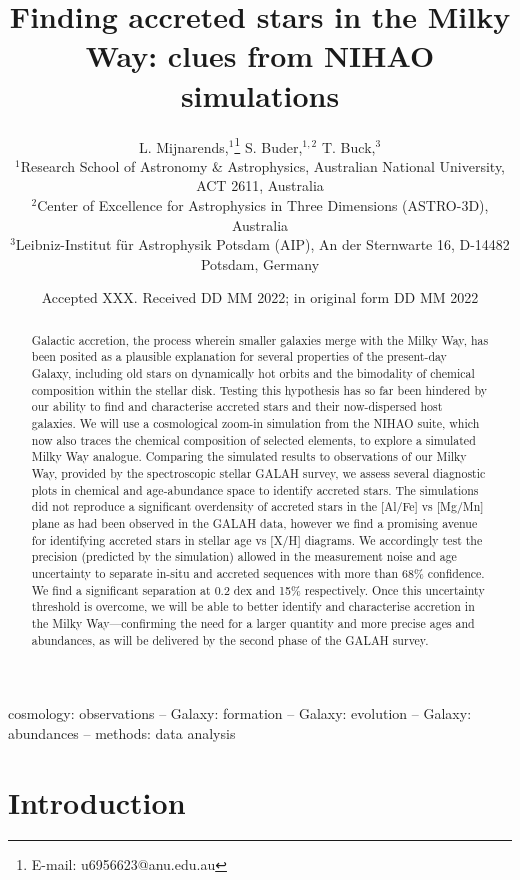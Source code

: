 \documentclass[fleqn,usenatbib]{mnras}
\title[Accreted stars in NIHAO]{Finding accreted stars in the Milky Way: clues from NIHAO simulations}
\author[L. Mijnarends et al.]{
L. Mijnarends,$^{1}$\thanks{E-mail: u6956623@anu.edu.au}
S. Buder,$^{1,2}$
T. Buck,$^{3}$
\\
$^{1}$Research School of Astronomy \& Astrophysics, Australian National University, ACT 2611, Australia\\
$^{2}$Center of Excellence for Astrophysics in Three Dimensions (ASTRO-3D), Australia\\
$^{3}$Leibniz-Institut f{\"u}r Astrophysik Potsdam (AIP), An der Sternwarte 16, D-14482 Potsdam, Germany
}
\date{Accepted XXX. Received DD MM 2022; in original form DD MM 2022}
\begin{document}
\label{firstpage}
\pagerange{\pageref{firstpage}--\pageref{lastpage}}
\maketitle

\begin{abstract}
Galactic accretion, the process wherein smaller galaxies merge with the Milky Way, has been posited as a plausible explanation for several properties of the present-day Galaxy, including old stars on dynamically hot orbits and the bimodality of chemical composition within the stellar disk. Testing this hypothesis has so far been hindered by our ability to find and characterise accreted stars and their now-dispersed host galaxies. We will use a cosmological zoom-in simulation from the NIHAO suite, which now also traces the chemical composition of selected elements, to explore a simulated Milky Way analogue. Comparing the simulated results to observations of our Milky Way, provided by the spectroscopic stellar GALAH survey, we assess several diagnostic plots in chemical and age-abundance space to identify accreted stars. The simulations did not reproduce a significant overdensity of accreted stars in the [Al/Fe] vs [Mg/Mn] plane as had been observed in the GALAH data, however we find a promising avenue for identifying accreted stars in stellar age vs [X/H] diagrams. We accordingly test the precision (predicted by the simulation) allowed in the measurement noise and age uncertainty to separate in-situ and accreted sequences with more than 68\% confidence. We find a significant separation at 0.2 dex and 15\% respectively. Once this uncertainty threshold is overcome, we will be able to better identify and characterise accretion in the Milky Way—confirming the need for a larger quantity and more precise ages and abundances, as will be delivered by the second phase of the GALAH survey. 
\end{abstract}
\begin{keywords}
cosmology: observations -- Galaxy: formation -- Galaxy: evolution -- Galaxy: abundances -- methods: data analysis
\end{keywords}



\section{Introduction}
\label{sec:intro}
\end{document}
